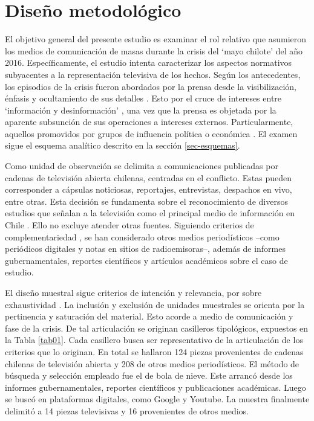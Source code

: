 \documentclass{textolivre}
\begin{document}
\section{Diseño metodológico}\label{sec-deseno}
El objetivo general del presente estudio es examinar el rol relativo que asumieron
los medios de comunicación de masas durante la crisis del ‘mayo chilote’ del año 2016.
Específicamente, el estudio intenta caracterizar los aspectos normativos subyacentes a la
representación televisiva de los hechos. Según los antecedentes, los episodios de la crisis
fueron abordados por la prensa desde la visibilización, énfasis y ocultamiento de sus
detalles \cite{cabello2018,ValdebenitoAllendes2018}. Esto por el cruce
de intereses entre ‘información y desinformación’ \cite{cardenas2019,Santander2014,sapiezynska2013}, 
una vez que la prensa es objetada por
la aparente subsunción de sus operaciones a intereses externos. Particularmente,
aquellos promovidos por grupos de influencia política o económica \cite{Habermas2006,Luhmann2007}. 
El examen sigue el esquema analítico descrito en la sección \ref{sec-esquemas}.

Como unidad de observación se delimita a comunicaciones publicadas por cadenas
de televisión abierta chilenas, centradas en el conflicto. Estas pueden corresponder a
cápsulas noticiosas, reportajes, entrevistas, despachos en vivo, entre otras. Esta decisión
se fundamenta sobre el reconocimiento de diversos estudios que señalan a la televisión
como el principal medio de información en Chile \cite{newman2019}. Ello no excluye
atender otras fuentes. Siguiendo criterios de complementariedad \cite{strauss2002}, 
se han considerado otros medios periodísticos --como periódicos digitales y notas
en sitios de radioemisoras--, además de informes gubernamentales, reportes científicos
y artículos académicos sobre el caso de estudio.

El diseño muestral sigue criterios de intención y relevancia, por sobre exhaustividad
\cite{MartnezSalgado2012}. La inclusión y exclusión de unidades muestrales se
orienta por la pertinencia y saturación del material. Esto acorde a medio de comunicación
y fase de la crisis. De tal articulación se originan casilleros tipológicos, expuestos en la
Tabla \ref{tab01}. Cada casillero busca ser representativo de la articulación de los criterios que lo
originan. En total se hallaron 124 piezas provenientes de cadenas chilenas de televisión
abierta y 208 de otros medios periodísticos. El método de búsqueda y selección
empleado fue el de bola de nieve. Este arrancó desde los informes gubernamentales,
reportes científicos y publicaciones académicas. Luego se buscó en plataformas digitales,
como Google y Youtube. La muestra finalmente delimitó a 14 piezas televisivas y 16
provenientes de otros medios.
\end{document}
